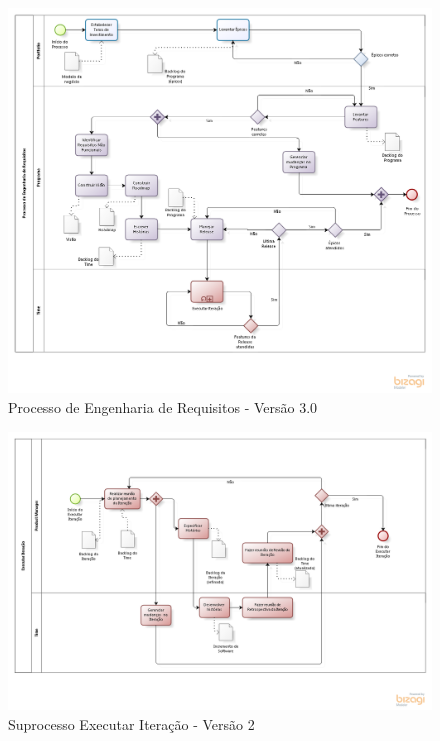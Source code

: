 \pagebreak
\begin{figure}[!htb]
\flushleft
\includegraphics[scale=0.6]{figuras/processo3.png}
\caption{Processo de Engenharia de Requisitos - Versão 3.0}
\label{fig:Processo}
\end{figure}

\begin{figure}[!htb]
\includegraphics[scale=0.5]{figuras/iteracao2.png}
\caption{Suprocesso Executar Iteração - Versão 2}
\label{fig:iteracao}
\end{figure}

\pagebreak



% 
% 
% 